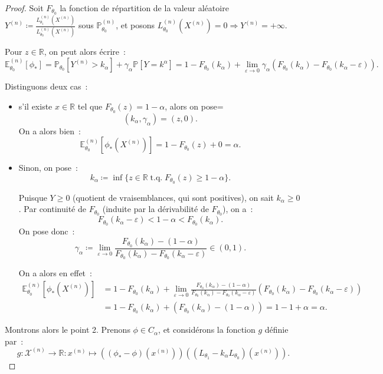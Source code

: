 \documentclass{report}
\DeclareMathOperator{\tq}{\text{ t.q. }}
\renewcommand{\P}{\mathbb P}
\newcommand{\E}{\mathbb E}
\newcommand{\pinfty}{{+\infty}}
\newcommand{\R}{\mathbb R}
\newcommand{\n}{{(n)}}
\newcommand{\Xn}{{X^\n}}
\theoremstyle{definition}
\theoremstyle{remark}
\begin{document}
		\begin{proof} Soit $F_{\theta_0}$ la fonction de répartition de la valeur aléatoire $Y^\n \coloneqq \frac {L_{\theta_1}^\n(\Xn)}{L_{\theta_0}^\n(\Xn)}$
		sous $\P_{\theta_0}^\n$, et posons $L_{\theta_0}^\n(\Xn) = 0 \Rightarrow Y^\n = \pinfty$.

		Pour $z \in \R$, on peut alors écrire~:
		\[\E_{\theta_0}^\n[\phi_*] = \P_{\theta_0}[Y^\n > k_\alpha] + \gamma_\alpha\P[Y=k^\alpha]
			= 1 - F_{\theta_0}(k_\alpha) + \lim_{\varepsilon \to 0}\gamma_\alpha\left(F_{\theta_0}(k_\alpha) - F_{\theta_0}(k_\alpha - \varepsilon)\right).\]

		Distinguons deux cas~:
		\begin{itemize}
			\item s'il existe $x \in \R$ tel que $F_{\theta_0}(z) = 1-\alpha$, alors on pose=
			\[(k_\alpha, \gamma_\alpha) = (z, 0).\]
			On a alors bien~:
			\[\E_{\theta_0}^\n[\phi_*(X^\n)] = 1 - F_{\theta_0}(z) + 0 = \alpha.\]

			\item Sinon, on pose~:
			\[k_\alpha \coloneqq \inf \{z \in \R \tq F_{\theta_0}(z) \geq 1-\alpha\}.\]

			Puisque $Y \geq 0$ (quotient de vraisemblances, qui sont positives), on sait $k_\alpha \geq 0$. Par continuité de $F_{\theta_0}$ (induite par la
			dérivabilité de $F_{\theta_0}$), on a~:
			\[F_{\theta_0}(k_\alpha-\varepsilon) < 1-\alpha < F_{\theta_0}(k_\alpha).\]
			On pose donc~:
			\[\gamma_\alpha \coloneqq \lim_{\varepsilon \to 0}\frac {F_{\theta_0}(k_\alpha) - (1-\alpha)}{F_{\theta_0}(k_\alpha) - F_{\theta_0}(k_\alpha - \varepsilon)} \in (0, 1).\]

			On a alors en effet~:
			\begin{align*}
				\E_{\theta_0}^\n[\phi_*(X^\n)] &= 1 - F_{\theta_0}(k_\alpha) +
					\lim_{\varepsilon \to 0}\frac {F_{\theta_0}(k_\alpha) - (1-\alpha)}{F_{\theta_0}(k_\alpha) - F_{\theta_0}(k_\alpha-\varepsilon)}
						\left(F_{\theta_0}(k_\alpha) - F_{\theta_0}(k_\alpha-\varepsilon)\right) \\
				&= 1 - F_{\theta_0}(k_\alpha) + (F_{\theta_0}(k_\alpha) - (1-\alpha)) = 1 - 1 + \alpha = \alpha.
			\end{align*}
		\end{itemize}

		Montrons alors le point 2. Prenons $\phi \in C_\alpha$, et considérons la fonction $g$ définie par~:
		\[g : \mathcal X^\n \to \R : x^\n \mapsto \left((\phi_*-\phi)(x^\n)\right)\left((L_{\theta_1}-k_\alpha L_{\theta_0})(x^\n)\right).\]


\end{proof}
\end{document}
